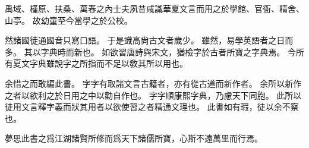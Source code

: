 禹域、槿原、扶桑、萬春之內士夫夙昔咸識華夏文言而用之於學館、官衙、精舍、山亭。
故幼童至今當學之於公校。

然諸國徒通國音只寫口語。
于是識高尙古文者歲少。
雖然，易學英語者之日而多。
其以字典時而新也。
如欲習唐詩與宋文，猶檢字於古者所寶之字典焉。
今所有夏文字典雖說字之所指而不足以敎其所以用也。

余惜之而敢編此書。
字字有取諸文言古籍者，亦有從古道而新作者。
余所以新作之者以欲利之於日用之中以勸自作也。
字字順康熙字典，乃慮天下同胞。
此所以徒用文言釋字義而狀其用者以欲使習之者精通文理也。
此書如有瑕，徒以余不察也。

夢思此書之爲江湖諸賢所修而爲天下諸儒所寶，心斯不遠萬里而行焉。
